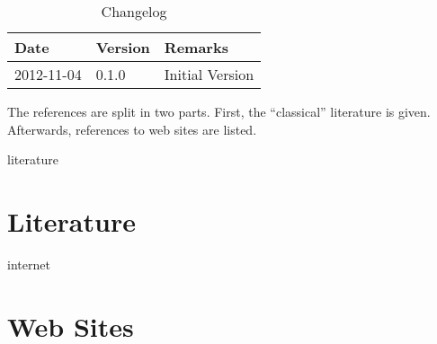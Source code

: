\begin{table}[H]
  \centering
  \caption{Changelog}
  \begin{tabular}{l l p{10cm}}
    \toprule
    \textbf{Date} & \textbf{Version} & \textbf{Remarks} \\
    \toprule
    2012-11-04 & 0.1.0 & Initial Version \\
    \bottomrule
  \end{tabular}
\end{table}

The references are split in two parts.
First, the ``classical'' literature is given.
Afterwards, references to web sites are listed.

\nocite{*}
\begin{btSect}[alpha]{literature}
  \section*{Literature}
  \btPrintAll
\end{btSect}

\begin{btSect}[alpha]{internet}
  \section*{Web Sites}
  \btPrintAll
\end{btSect}

%
%

\newpage
\printindex




